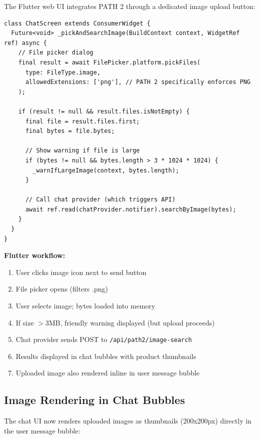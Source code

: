 The Flutter web UI integrates PATH 2 through a dedicated image upload button:

\begin{lstlisting}[caption={Flutter Image Search Integration --- chat\_screen.dart}]
class ChatScreen extends ConsumerWidget {
  Future<void> _pickAndSearchImage(BuildContext context, WidgetRef ref) async {
    // File picker dialog
    final result = await FilePicker.platform.pickFiles(
      type: FileType.image,
      allowedExtensions: ['png'], // PATH 2 specifically enforces PNG
    );
    
    if (result != null && result.files.isNotEmpty) {
      final file = result.files.first;
      final bytes = file.bytes;
      
      // Show warning if file is large
      if (bytes != null && bytes.length > 3 * 1024 * 1024) {
        _warnIfLargeImage(context, bytes.length);
      }
      
      // Call chat provider (which triggers API)
      await ref.read(chatProvider.notifier).searchByImage(bytes);
    }
  }
}
\end{lstlisting}

\textbf{Flutter workflow:}
\begin{enumerate}
    \item User clicks image icon next to send button
    \item File picker opens (filters .png)
    \item User selects image; bytes loaded into memory
    \item If size $>$3MB, friendly warning displayed (but upload proceeds)
    \item Chat provider sends POST to \texttt{/api/path2/image-search}
    \item Results displayed in chat bubbles with product thumbnails
    \item Uploaded image also rendered inline in user message bubble
\end{enumerate}

\subsection{Image Rendering in Chat Bubbles}

The chat UI now renders uploaded images as thumbnails (200x200px) directly in the user message bubble:

